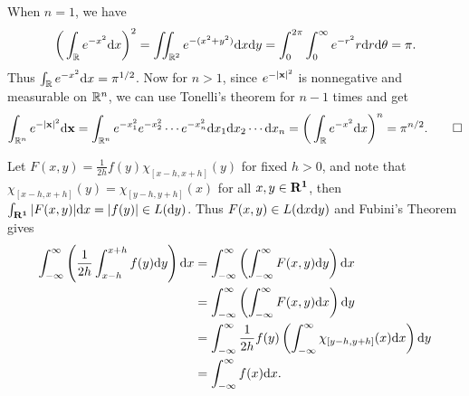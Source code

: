 \begin{exercise}{6.11}
  When $n=1$, we have
  \[
    \bigg(\int_{\mathbb{R}}e^{-x^2}\mathrm{d} x\bigg)^2=\iint_{\mathbb{R}^2}e^{-(x^2+y^2)}\mathrm{d} x\mathrm{d} y=\int_0^{2\pi}\int_0^\infty e^{-r^2}r\mathrm{d} r\mathrm{d}\theta=\pi.
  \]
  Thus $\int_{\mathbb{R}}e^{-x^2}\mathrm{d} x=\pi^{1/2}$. Now for $n>1$, since $e^{-|\mathbf{x}|^2}$ is nonnegative and measurable on $\mathbb{R}^n$, we can use Tonelli's theorem for $n-1$ times and get
  \[
    \int_{\mathbb{R}^n}e^{-|\mathbf{x}|^2}\mathrm{d}\mathbf{x}=\int_{\mathbb{R}^n}e^{-x_1^2}e^{-x_2^2}\cdots e^{-x_n^2}\mathrm{d} x_1\mathrm{d} x_2\cdots \mathrm{d} x_n=\bigg(\int_{\mathbb{R}}e^{-x^2}\mathrm{d} x\bigg)^n=\pi^{n/2}.
    \qedhere
  \]
\end{exercise}
\begin{exercise}{6.13}
Let $F(x,y)=\frac{1}{2h}f(y)\chi_{[x-h,x+h]}(y)$ for fixed $h>0$, and note that $\chi_{[x-h,x+h]}(y)=\chi_{[y-h,y+h]}(x)$ for all $x,y\in\mathbf{R^1}$, then $\int_{\mathbf{R^1}}|F(x,y)|\mathrm{d} x=|f(y)|\in L(\mathrm{d} y)$. Thus $F(x,y)\in L(\mathrm{d} x\mathrm{d} y)$ and Fubini's Theorem gives 
\begin{equation*}
	\begin{aligned}
	\int_{-\infty}^{\infty}\left(\frac{1}{2h}\int_{x-h}^{x+h}f(y)\mathrm{d} y\right)\mathrm{d} x&=	\int_{-\infty}^{\infty}\left(	\int_{-\infty}^{\infty} F(x,y)\mathrm{d} y\right)\mathrm{d} x\\&=\int_{-\infty}^{\infty}\left(	\int_{-\infty}^{\infty} F(x,y)\mathrm{d} x\right)\mathrm{d} y\\
	&=	\int_{-\infty}^{\infty}\frac{1}{2h}f(y)\left(	\int_{-\infty}^{\infty} \chi_{[y-h,y+h]}(x)\mathrm{d} x\right)\mathrm{d} y\\
	&=\int_{-\infty}^{\infty}f(x)\mathrm{d} x.
	\end{aligned}
\end{equation*}
\end{exercise}
